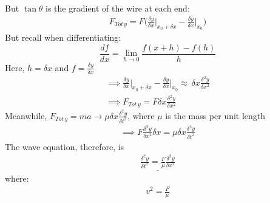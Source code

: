 \documentclass[a4paper, 11pt, fleqn, normalem]{report}
\begin{document}
But $\tan{\theta}$ is the gradient of the wire at each end:
\begin{gather*}
    F_{Tot\,y} = F\Big(\frac{{\delta}y}{{\delta}x}\Big|_{x_{0} + {\delta}x} - \frac{{\delta}y}{{\delta}x}\Big|_{x_{0}}\Big)
\end{gather*}
But recall when differentiating:
\begin{equation*}
    \frac{df}{dx} = \lim_{h\to0} \frac{f(x+h) - f(h)}{h}
\end{equation*}
Here, $h = {\delta}x$ and $f = \frac{{\delta}y}{{\delta}x}$
\begin{gather*}
    \implies \frac{{\delta}y}{{\delta}x}\Big|_{x_{0} + {\delta}x} - \frac{{\delta}y}{{\delta}x}\Big|_{x_{0}} \approx~ \delta x \frac{\delta^{2}y}{\delta x^{2}} \\
    \implies F_{Tot\,y} = F\delta x\frac{\delta^{2}y}{\delta x^{2}}
\end{gather*}
Meanwhile, $F_{Tot\,y} = ma \rightarrow \mu\delta x \frac{\delta^{2}y}{\delta t^{2}}$, where $\mu$ is the mass per unit length
\begin{gather*}
    \implies F\frac{\delta^{2}y}{\delta x^{2}} \delta x = \mu\delta x\frac{\delta^{2}y}{\delta t^{2}}
\end{gather*}
The wave equation, therefore, is
\begin{gather*}
    \underline{\frac{\delta^{2}y}{\delta t^{2}} = \frac{F}{\mu}\frac{\delta^{2}y}{\delta x^{2}}}
\end{gather*}
where:
\begin{gather*}
    v^{2} = \frac{F}{\mu}
\end{gather*}
\end{document}

